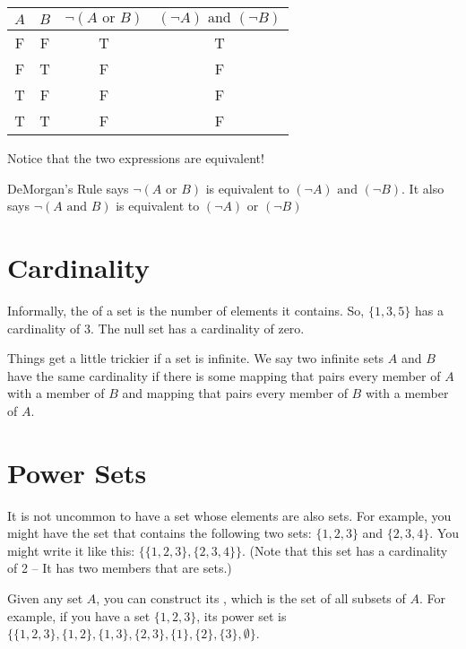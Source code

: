 \begin{Answer}[ref=logic_table]

\begin{tabular}{c | c | c | c}
  $A$ & $B$ & $\neg \left(A \text{ or } B \right)$
  & $\left(\neg A \right) \text{ and } \left(\neg B \right)$ \\
  \hline
  F & F & T & T \\
  F & T & F & F \\
  T & F & F & F \\
  T & T & F & F \\
\end{tabular}

Notice that the two expressions are equivalent!

DeMorgan's Rule says $\neg \left(A \text{ or } B \right)$ is
equivalent to $\left(\neg A \right) \text{ and } \left(\neg B
\right)$.  It also says $\neg \left(A \text{ and } B \right)$ is
equivalent to $\left(\neg A \right) \text{ or } \left(\neg B\right)$
\end{Answer}

\section{Cardinality}

Informally, the  of a set is the number of
elements it contains. So, $\{1,3,5\}$ has a cardinality of 3.  The
null set has a cardinality of zero.

Things get a little trickier if a set is infinite.  We say two
infinite sets $A$ and $B$ have the same cardinality if there is some
mapping that pairs every member of $A$ with a member of $B$ and
mapping that pairs every member of $B$ with a member of $A$.

\section{Power Sets}

It is not uncommon to have a set whose elements are also sets.  For
example, you might have the set that contains the following two sets:
$\{1,2,3\}$ and $\{2,3,4\}$. You might write it like this: $\{
\{1,2,3\}, \{2,3,4\} \}$. (Note that this set has a cardinality of 2
-- It has two members that are sets.)

Given any set $A$, you can construct its , which is
the set of all subsets of $A$.  For example, if you have a set
$\{1,2,3\}$, its power set is $\{\{1,2,3\}, \{1,2\},\{1,3\}, \{2,3\},
\{1\}, \{2\}, \{3\}, \emptyset\}$.

